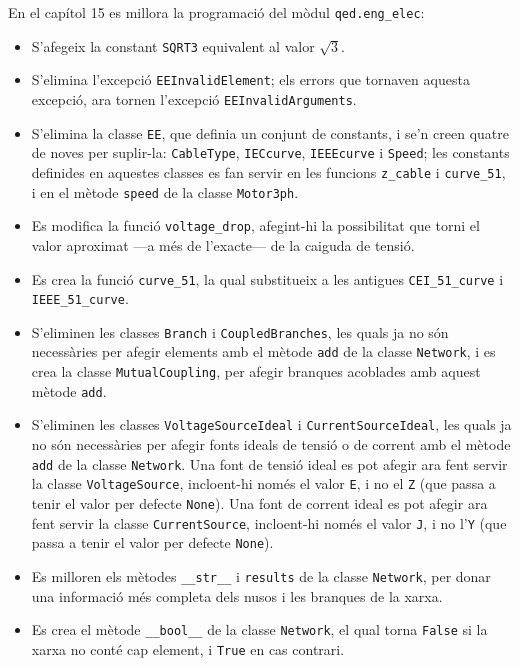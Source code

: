 En el capítol 15 es millora la programació del mòdul  \texttt{qed.eng\_elec}:
\begin{itemize}
	\item S'afegeix la constant \texttt{SQRT3} equivalent al valor $\sqrt{3}$.
	\item S'elimina l'excepció \texttt{EEInvalidElement}; els errors que tornaven aquesta excepció, ara tornen l'excepció \texttt{EEInvalidArguments}. 
	\item S'elimina la classe \texttt{EE}, que definia un conjunt de constants, i se'n creen quatre de noves per suplir-la: \texttt{CableType}, \texttt{IECcurve}, \texttt{IEEEcurve} i \texttt{Speed}; les constants definides en aquestes classes es fan servir en les funcions \texttt{z\_cable} i \texttt{curve\_51}, i en el mètode \texttt{speed} de la classe \texttt{Motor3ph}.
	\item Es modifica la funció \texttt{voltage\_drop}, afegint-hi la possibilitat que torni el valor aproximat ---a més de l'exacte--- de la caiguda de tensió.
	\item Es crea la funció \texttt{curve\_51}, la qual substitueix a les antigues \texttt{CEI\_51\_curve} i \texttt{IEEE\_51\_curve}.
	\item S'eliminen les classes \texttt{Branch} i \texttt{CoupledBranches}, les quals ja no són necessàries per afegir elements amb el mètode \texttt{add} de la classe \texttt{Network}, i es crea la  classe \texttt{MutualCoupling}, per afegir branques acoblades amb aquest mètode \texttt{add}. 
	\item S'eliminen les classes \texttt{VoltageSourceIdeal} i \texttt{CurrentSourceIdeal}, les quals ja no són necessàries per afegir fonts ideals de tensió o de corrent amb el mètode \texttt{add} de la classe \texttt{Network}. Una font de tensió ideal es pot afegir ara fent servir la classe \texttt{VoltageSource}, incloent-hi només el valor \texttt{E}, i no el \texttt{Z} (que passa a tenir el valor per defecte \texttt{None}). Una font de corrent ideal es pot afegir ara fent servir la classe \texttt{CurrentSource}, incloent-hi només el valor \texttt{J}, i no l'\texttt{Y} (que passa a tenir el valor per defecte \texttt{None}).
	\item Es milloren els mètodes \texttt{\_\_str\_\_} i \texttt{results} de la classe \texttt{Network}, per  donar una informació més completa dels nusos i les branques de la xarxa.
	\item Es crea el mètode \texttt{\_\_bool\_\_} de la classe \texttt{Network}, el qual torna \texttt{False} si la xarxa no conté cap element, i \texttt{True} en cas contrari.

\end{itemize}
